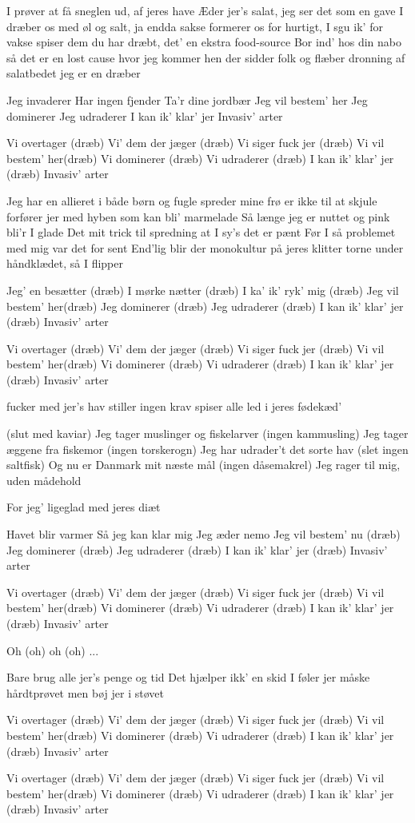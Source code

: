 \documentclass[a4paper,11pt]{article}
\begin{document}
\begin{song}

I prøver at få sneglen ud,
af jeres have
Æder jer's salat, jeg ser det
som en gave
I dræber os med øl og salt,
ja endda sakse
formerer os for hurtigt, I sgu
ik' for vakse
spiser dem du har dræbt, det'
en ekstra food-source
Bor ind' hos din nabo så det er
en lost cause
hvor jeg kommer hen der sidder
folk og flæber
dronning af salatbedet
jeg er en dræber


Jeg invaderer
Har ingen fjender
Ta’r dine jordbær
Jeg vil bestem’ her
Jeg dominerer
Jeg udraderer
I kan ik’ klar’ jer
Invasiv' arter


Vi overtager (dræb)
Vi' dem der jæger (dræb)
Vi siger fuck jer (dræb)
Vi vil bestem’ her(dræb)
Vi dominerer (dræb)
Vi udraderer (dræb)
I kan ik’ klar’ jer (dræb)
Invasiv' arter


 Jeg har en allieret i både		
børn og fugle
spreder mine frø er ikke		
til at skjule
forfører jer med hyben som kan bli'
marmelade
Så længe jeg er nuttet og pink
bli'r I glade
Det mit trick til spredning at 		
I sy's det er pænt
Før I så problemet med mig	
var det for sent
End'lig blir der monokultur 		
på jeres klitter
torne under håndklædet, 	
så I flipper


Jeg’ en besætter (dræb) 
I mørke nætter (dræb)
I ka’ ik’ ryk’ mig (dræb)
Jeg vil bestem’ her(dræb)
Jeg dominerer (dræb)
Jeg udraderer (dræb)
I kan ik’ klar’ jer (dræb)
Invasiv' arter


Vi overtager (dræb)
Vi' dem der jæger (dræb)
Vi siger fuck jer (dræb)
Vi vil bestem’ her(dræb)
Vi dominerer (dræb)
Vi udraderer (dræb)
I kan ik’ klar’ jer (dræb)
Invasiv' arter


fucker med jer’s hav
stiller ingen krav
spiser alle led i jeres fødekæd’


(slut med kaviar)
Jeg tager muslinger og fiskelarver
(ingen kammusling)
Jeg tager æggene fra fiskemor
(ingen torskerogn)
Jeg har udrader’t det sorte hav
(slet ingen saltfisk)
Og nu er Danmark mit næste mål
(ingen dåsemakrel)
Jeg rager til mig, uden mådehold


For jeg' ligeglad med jeres diæt


Havet blir varmer
Så jeg kan klar mig
Jeg æder nemo
Jeg vil bestem’ nu (dræb)
Jeg dominerer (dræb)
Jeg udraderer (dræb)
I kan ik’ klar’ jer (dræb)
Invasiv' arter


Vi overtager (dræb)
Vi' dem der jæger (dræb)
Vi siger fuck jer (dræb)
Vi vil bestem’ her(dræb)
Vi dominerer (dræb)
Vi udraderer (dræb)
I kan ik’ klar’ jer (dræb)
Invasiv' arter


Oh (oh) oh (oh) ...


Bare brug alle jer's penge og tid
Det hjælper ikk' en skid
I føler jer måske hårdtprøvet
men bøj jer i støvet


Vi overtager (dræb)
Vi' dem der jæger (dræb)
Vi siger fuck jer (dræb)
Vi vil bestem’ her(dræb)
Vi dominerer (dræb)
Vi udraderer (dræb)
I kan ik’ klar’ jer (dræb)
Invasiv' arter

Vi overtager (dræb)
Vi' dem der jæger (dræb)
Vi siger fuck jer (dræb)
Vi vil bestem’ her(dræb)
Vi dominerer (dræb)
Vi udraderer (dræb)
I kan ik’ klar’ jer (dræb)
Invasiv' arter

\end{song}
\end{document}
